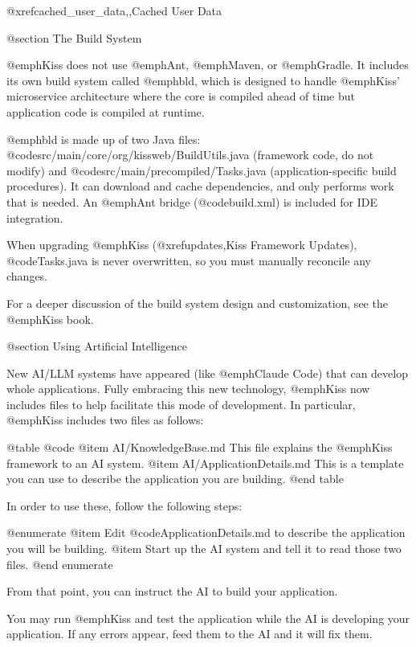 @xref{cached_user_data,,Cached User Data}

@section The Build System

@emph{Kiss} does not use @emph{Ant}, @emph{Maven}, or @emph{Gradle}.
It includes its own build system called @emph{bld}, which is designed
to handle @emph{Kiss}' microservice architecture where the core is
compiled ahead of time but application code is compiled at runtime.

@emph{bld} is made up of two Java files:
@code{src/main/core/org/kissweb/BuildUtils.java} (framework code,
do not modify) and @code{src/main/precompiled/Tasks.java}
(application-specific build procedures).  It can download and cache
dependencies, and only performs work that is needed.  An @emph{Ant}
bridge (@code{build.xml}) is included for IDE integration.

When upgrading @emph{Kiss} (@xref{updates,Kiss Framework Updates}),
@code{Tasks.java} is never overwritten, so you must manually reconcile
any changes.

For a deeper discussion of the build system design and customization,
see the @emph{Kiss} book.

@section Using Artificial Intelligence

New AI/LLM systems have appeared (like @emph{Claude Code}) that can develop whole applications.
Fully embracing this new technology, @emph{Kiss} now includes files to help facilitate this mode of development.
In particular, @emph{Kiss} includes two files as follows:

@table @code
@item AI/KnowledgeBase.md
This file explains the @emph{Kiss} framework to an AI system.
@item AI/ApplicationDetails.md
This is a template you can use to describe the application you are building.
@end table

In order to use these, follow the following steps:

@enumerate
@item
Edit @code{ApplicationDetails.md} to describe the application you will be building.
@item Start up the AI system and tell it to read those two files.
@end enumerate

From that point, you can instruct the AI to build your application.

You may run @emph{Kiss} and test the application while the AI is developing your application.  If any errors appear, feed them to the AI
and it will fix them.


